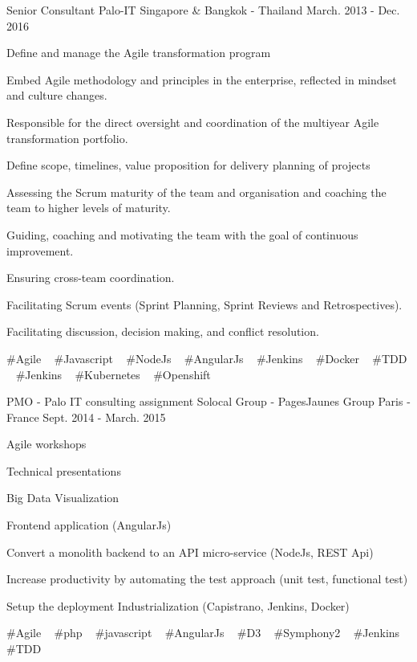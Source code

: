 \begin{cventries}
  \cventry
    {Senior Consultant} %
    {Palo-IT} %
    {Singapore \& Bangkok - Thailand} %
    {March. 2013 - Dec. 2016} %
    {
      \begin{cvitems} %
        \item {Define and manage the Agile transformation program}
        \item {Embed Agile methodology and principles in the enterprise, reflected in mindset and culture changes.}
        \item {Responsible for the direct oversight and coordination of the multiyear Agile transformation portfolio.}
        \item {Define scope, timelines, value proposition for delivery planning of projects}
        \item {Assessing the Scrum maturity of the team and organisation and coaching the team to higher levels of maturity.}
        \item {Guiding, coaching and motivating the team with the goal of continuous improvement.}
        \item {Ensuring cross-team coordination.}
        \item {Facilitating Scrum events (Sprint Planning, Sprint Reviews and Retrospectives).}
        \item {Facilitating discussion, decision making, and conflict resolution.}
      \end{cvitems}
    }
    {
      \#Agile ~
      \#Javascript ~
      \#NodeJs ~
      \#AngularJs ~
      \#Jenkins ~
      \#Docker ~
      \#TDD ~
      \#Jenkins ~
      \#Kubernetes ~
      \#Openshift
    }

  \cventry
    {PMO - Palo IT consulting assignment} %
    {Solocal Group - PagesJaunes Group} %
    {Paris - France} %
    {Sept. 2014 - March. 2015} %
    {
      \begin{cvitems} %
        \item {Agile workshops}
        \item {Technical presentations}
        \item {Big Data Visualization}
        \item {Frontend application (AngularJs)}
        \item {Convert a monolith backend to an API micro-service (NodeJs, REST Api)}
        \item {Increase productivity by automating the test approach (unit test, functional test)}
        \item {Setup the deployment Industrialization (Capistrano, Jenkins, Docker)}
      \end{cvitems}
    }
    {
      \#Agile ~
      \#php ~
      \#javascript ~
      \#AngularJs ~
      \#D3 ~
      \#Symphony2 ~
      \#Jenkins ~
      \#TDD
    }


\end{cventries}
